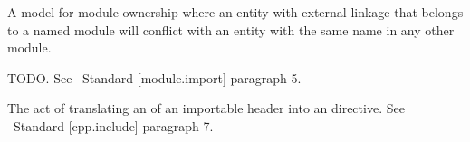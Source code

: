 A model for module ownership where an entity with external linkage that belongs
to a named module will conflict with an entity with the same name in any other
module.

TODO. See \Cpp~Standard [module.import] paragraph 5.

The act of translating an  of an importable header into an
 directive. See \Cpp~Standard [cpp.include] paragraph 7.


